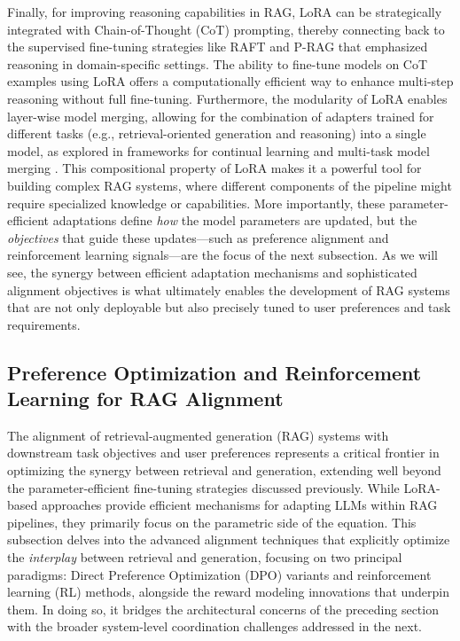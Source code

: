 \documentclass[11pt]{article}
\begin{document}
Finally, for improving reasoning capabilities in RAG, LoRA can be strategically integrated with Chain-of-Thought (CoT) prompting, thereby connecting back to the supervised fine-tuning strategies like RAFT and P-RAG that emphasized reasoning in domain-specific settings. The ability to fine-tune models on CoT examples using LoRA offers a computationally efficient way to enhance multi-step reasoning without full fine-tuning. Furthermore, the modularity of LoRA enables layer-wise model merging, allowing for the combination of adapters trained for different tasks (e.g., retrieval-oriented generation and reasoning) into a single model, as explored in frameworks for continual learning and multi-task model merging \cite{ref251,ref252}. This compositional property of LoRA makes it a powerful tool for building complex RAG systems, where different components of the pipeline might require specialized knowledge or capabilities. More importantly, these parameter-efficient adaptations define \emph{how} the model parameters are updated, but the \emph{objectives} that guide these updates---such as preference alignment and reinforcement learning signals---are the focus of the next subsection. As we will see, the synergy between efficient adaptation mechanisms and sophisticated alignment objectives is what ultimately enables the development of RAG systems that are not only deployable but also precisely tuned to user preferences and task requirements.

\subsection{Preference Optimization and Reinforcement Learning for RAG Alignment}

The alignment of retrieval-augmented generation (RAG) systems with downstream task objectives and user preferences represents a critical frontier in optimizing the synergy between retrieval and generation, extending well beyond the parameter-efficient fine-tuning strategies discussed previously. While LoRA-based approaches provide efficient mechanisms for adapting LLMs within RAG pipelines, they primarily focus on the parametric side of the equation. This subsection delves into the advanced alignment techniques that explicitly optimize the \emph{interplay} between retrieval and generation, focusing on two principal paradigms: Direct Preference Optimization (DPO) variants and reinforcement learning (RL) methods, alongside the reward modeling innovations that underpin them. In doing so, it bridges the architectural concerns of the preceding section with the broader system-level coordination challenges addressed in the next.
\end{document}
